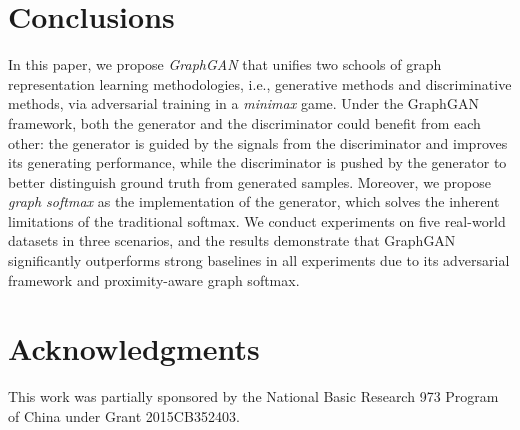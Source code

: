 \documentclass[letterpaper]{article}
\begin{document}
\section{Conclusions}
	In this paper, we propose \textit{GraphGAN} that unifies two schools of graph representation learning methodologies, i.e., generative methods and discriminative methods, via adversarial training in a \textit{minimax} game.
	Under the GraphGAN framework, both the generator and the discriminator could benefit from each other:
	the generator is guided by the signals from the discriminator and improves its generating performance, while the discriminator is pushed by the generator to better distinguish ground truth from generated samples.
	Moreover, we propose \textit{graph softmax} as the implementation of the generator, which solves the inherent limitations of the traditional softmax.
	We conduct experiments on five real-world datasets in three scenarios, and the results demonstrate that GraphGAN significantly outperforms strong baselines in all experiments due to its adversarial framework and proximity-aware graph softmax.




\section{Acknowledgments}
	This work was partially sponsored by the National Basic Research 973 Program of China under Grant 2015CB352403.



 
\end{document}
